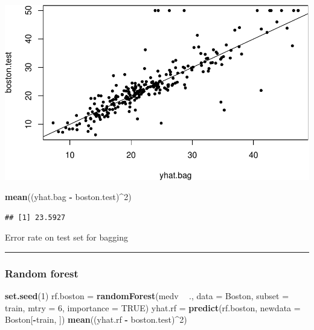 \documentclass[]{article}
\newenvironment{Shaded}{\begin{snugshade}}{\end{snugshade}}
\newcommand{\DataTypeTok}[1]{\textcolor[rgb]{0.13,0.29,0.53}{#1}}
\newcommand{\DecValTok}[1]{\textcolor[rgb]{0.00,0.00,0.81}{#1}}
\newcommand{\KeywordTok}[1]{\textcolor[rgb]{0.13,0.29,0.53}{\textbf{#1}}}
\newcommand{\NormalTok}[1]{#1}
\newcommand{\OperatorTok}[1]{\textcolor[rgb]{0.81,0.36,0.00}{\textbf{#1}}}
\newcommand{\OtherTok}[1]{\textcolor[rgb]{0.56,0.35,0.01}{#1}}
\newcommand{\StringTok}[1]{\textcolor[rgb]{0.31,0.60,0.02}{#1}}
\begin{document}
\includegraphics{8Trees_files/figure-latex/unnamed-chunk-44-1.pdf}

\begin{Shaded}
\begin{Highlighting}[]
\KeywordTok{mean}\NormalTok{((yhat.bag }\OperatorTok{-}\StringTok{ }\NormalTok{boston.test)}\OperatorTok{^}\DecValTok{2}\NormalTok{)}
\end{Highlighting}
\end{Shaded}

\begin{verbatim}
## [1] 23.5927
\end{verbatim}

Error rate on test set for bagging

\begin{center}\rule{0.5\linewidth}{\linethickness}\end{center}

\hypertarget{random-forest}{%
\subsubsection{Random forest}\label{random-forest}}

\begin{Shaded}
\begin{Highlighting}[]
\KeywordTok{set.seed}\NormalTok{(}\DecValTok{1}\NormalTok{)}
\NormalTok{rf.boston =}\StringTok{ }\KeywordTok{randomForest}\NormalTok{(medv }\OperatorTok{~}\StringTok{ }\NormalTok{., }\DataTypeTok{data =}\NormalTok{ Boston, }\DataTypeTok{subset =}\NormalTok{ train, }\DataTypeTok{mtry =} \DecValTok{6}\NormalTok{, }
    \DataTypeTok{importance =} \OtherTok{TRUE}\NormalTok{)}
\NormalTok{yhat.rf =}\StringTok{ }\KeywordTok{predict}\NormalTok{(rf.boston, }\DataTypeTok{newdata =}\NormalTok{ Boston[}\OperatorTok{-}\NormalTok{train, ])}
\KeywordTok{mean}\NormalTok{((yhat.rf }\OperatorTok{-}\StringTok{ }\NormalTok{boston.test)}\OperatorTok{^}\DecValTok{2}\NormalTok{)}
\end{Highlighting}
\end{Shaded}
\end{document}
